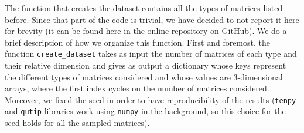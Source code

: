 \documentclass[a4paper,11pt]{article}
\begin{document}
\noindent The function that creates the dataset contains all the types of matrices listed before. Since that part of the code is trivial, we have decided to not report it here for brevity (it can be found \href{https://github.com/nunziacerrato/Numerical_Analysis_Optimization/blob/main/Project_1/Project_1.py}{here} in the online repository on GitHub). We do a brief description of how we organize this function. First and foremost, the function \texttt{create_dataset} takes as input the number of matrices of each type and their relative dimension and gives as output a dictionary whose keys represent the different types of matrices considered and whose values are 3-dimensional arrays, where the first index cycles on the number of matrices considered.
Moreover, we fixed the seed in order to have reproducibility of the results (\texttt{tenpy} and \texttt{qutip} libraries work using \texttt{numpy} in the background, so this choice for the seed holds for all the sampled matrices).
%
%
\end{document}
